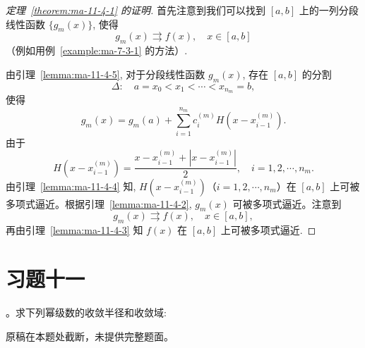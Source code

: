 \begin{proof}[{定理~\ref{theorem:ma-11-4-1} 的证明}]
首先注意到我们可以找到 $[a,b]$ 上的一列分段线性函数 $\{g_m(x)\}$, 使得
\[
  g_m(x)\rightrightarrows f(x),\quad x\in[a,b]
\]
（例如用例~\ref{example:ma-7-3-1} 的方法）.

由引理~\ref{lemma:ma-11-4-5}, 对于分段线性函数 $g_m(x)$, 存在 $[a,b]$ 的分割
\[
  \Delta:\quad a=x_0<x_1<\cdots<x_{n_m}=b,
\]
使得
\[
  g_m(x)=g_m(a)+\sum_{i=1}^{n_m}c_i^{(m)}H(x-x_{i-1}^{(m)}).
\]
由于
\[
  H(x-x_{i-1}^{(m)})
  =
  \frac{x-x_{i-1}^{(m)}+|x-x_{i-1}^{(m)}|}{2},
  \quad i=1,2,\cdots,n_m.
\]
由引理~\ref{lemma:ma-11-4-4} 知, $H(x-x_{i-1}^{(m)})$（$i=1,2,\cdots,n_m$）在 $[a,b]$ 上可被多项式逼近。根据引理~\ref{lemma:ma-11-4-2}, $g_m(x)$ 可被多项式逼近。注意到
\[
  g_m(x)\rightrightarrows f(x),\quad x\in[a,b],
\]
再由引理~\ref{lemma:ma-11-4-3} 知 $f(x)$ 在 $[a,b]$ 上可被多项式逼近.
\end{proof}


\section*{习题十一}
{}
\label{exercises:ma-11}

。求下列幂级数的收敛半径和收敛域:

\begin{remark}
原稿在本题处截断，未提供完整题面。
\end{remark}

